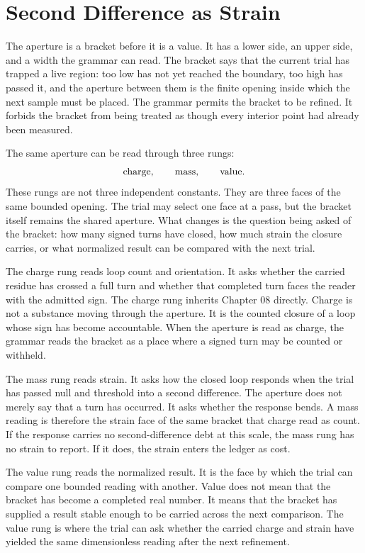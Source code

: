 \section{Second Difference as Strain}

The aperture is a bracket before it is a value. It has a lower side, an upper
side, and a width the grammar can read. The bracket says that the current
trial has trapped a live region: too low has not yet reached the boundary,
too high has passed it, and the aperture between them is the finite opening
inside which the next sample must be placed. The grammar permits the bracket
to be refined. It forbids the bracket from being treated as though every
interior point had already been measured.

The same aperture can be read through three rungs:
\[
  \hbox{charge},\qquad \hbox{mass},\qquad \hbox{value}.
\]
These rungs are not three independent constants. They are three faces of the
same bounded opening. The trial may select one face at a pass, but the bracket
itself remains the shared aperture. What changes is the question being asked
of the bracket: how many signed turns have closed, how much strain the
closure carries, or what normalized result can be compared with the next
trial.

The charge rung reads loop count and orientation. It asks whether the carried
residue has crossed a full turn and whether that completed turn faces the
reader with the admitted sign. The charge rung inherits Chapter 08 directly.
Charge is not a substance moving through the aperture. It is the counted
closure of a loop whose sign has become accountable. When the aperture is
read as charge, the grammar reads the bracket as a place where a signed
turn may be counted or withheld.

The mass rung reads strain. It asks how the closed loop responds when the
trial has passed null and threshold into a second difference. The aperture
does not merely say that a turn has occurred. It asks whether the response
bends. A mass reading is therefore the strain face of the same bracket that
charge read as count. If the response carries no second-difference debt at
this scale, the mass rung has no strain to report. If it does, the strain
enters the ledger as cost.

The value rung reads the normalized result. It is the face by which the
trial can compare one bounded reading with another. Value does not mean that
the bracket has become a completed real number. It means that the bracket
has supplied a result stable enough to be carried across the next comparison.
The value rung is where the trial can ask whether the carried charge and
strain have yielded the same dimensionless reading after the next refinement.

